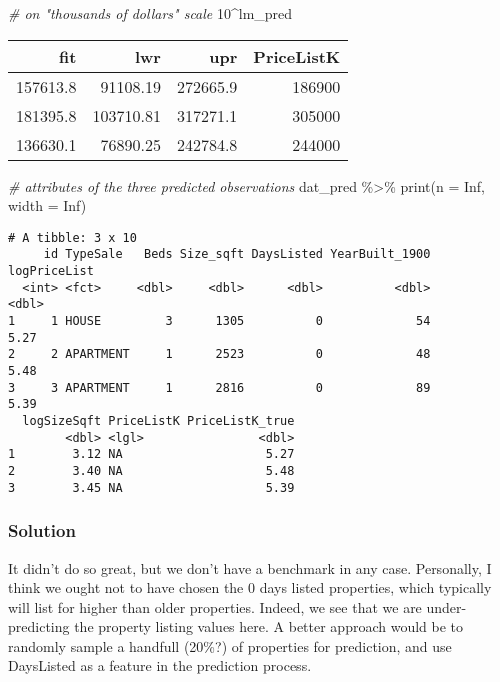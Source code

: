 \documentclass[
  12pt,
]{article}
\newenvironment{Shaded}{\begin{snugshade}}{\end{snugshade}}
\newcommand{\AttributeTok}[1]{\textcolor[rgb]{0.77,0.63,0.00}{#1}}
\newcommand{\CommentTok}[1]{\textcolor[rgb]{0.56,0.35,0.01}{\textit{#1}}}
\newcommand{\ConstantTok}[1]{\textcolor[rgb]{0.00,0.00,0.00}{#1}}
\newcommand{\DecValTok}[1]{\textcolor[rgb]{0.00,0.00,0.81}{#1}}
\newcommand{\FunctionTok}[1]{\textcolor[rgb]{0.00,0.00,0.00}{#1}}
\newcommand{\NormalTok}[1]{#1}
\newcommand{\SpecialCharTok}[1]{\textcolor[rgb]{0.00,0.00,0.00}{#1}}
\begin{document}
\begin{Shaded}
\begin{Highlighting}[]
\CommentTok{\# on "thousands of dollars" scale}
\DecValTok{10}\SpecialCharTok{\^{}}\NormalTok{lm\_pred}
\end{Highlighting}
\end{Shaded}

\begin{tabular}{r|r|r|r}
\hline
fit & lwr & upr & PriceListK\\
\hline
157613.8 & 91108.19 & 272665.9 & 186900\\
\hline
181395.8 & 103710.81 & 317271.1 & 305000\\
\hline
136630.1 & 76890.25 & 242784.8 & 244000\\
\hline
\end{tabular}

\begin{Shaded}
\begin{Highlighting}[]
\CommentTok{\# attributes of the three predicted observations}
\NormalTok{dat\_pred }\SpecialCharTok{\%\textgreater{}\%} \FunctionTok{print}\NormalTok{(}\AttributeTok{n =} \ConstantTok{Inf}\NormalTok{, }\AttributeTok{width =} \ConstantTok{Inf}\NormalTok{)}
\end{Highlighting}
\end{Shaded}

\begin{verbatim}
# A tibble: 3 x 10
     id TypeSale   Beds Size_sqft DaysListed YearBuilt_1900 logPriceList
  <int> <fct>     <dbl>     <dbl>      <dbl>          <dbl>        <dbl>
1     1 HOUSE         3      1305          0             54         5.27
2     2 APARTMENT     1      2523          0             48         5.48
3     3 APARTMENT     1      2816          0             89         5.39
  logSizeSqft PriceListK PriceListK_true
        <dbl> <lgl>                <dbl>
1        3.12 NA                    5.27
2        3.40 NA                    5.48
3        3.45 NA                    5.39
\end{verbatim}

\hypertarget{solution-5}{%
\subsubsection{Solution}\label{solution-5}}

It didn't do so great, but we don't have a benchmark in any case.
Personally, I think we ought not to have chosen the 0 days listed
properties, which typically will list for higher than older properties.
Indeed, we see that we are under-predicting the property listing values
here. A better approach would be to randomly sample a handfull (20\%?)
of properties for prediction, and use DaysListed as a feature in the
prediction process.
\end{document}
